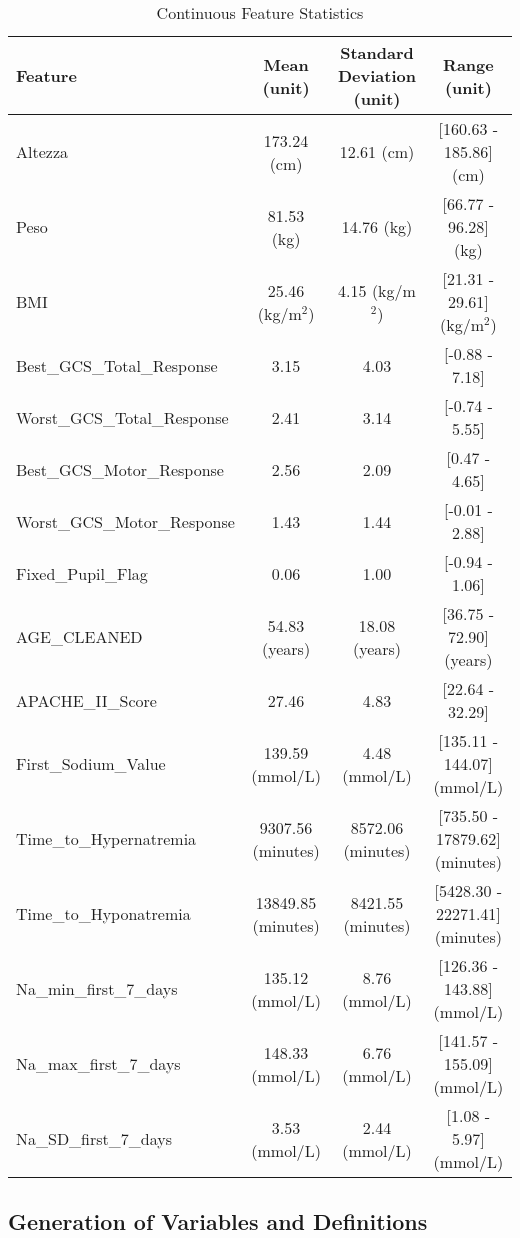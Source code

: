 \begin{table}[h!]
	\centering
	\tiny %
	\begin{tabular}{lccc}
		\hline
		\textbf{Feature} & \textbf{Mean (unit)} & \textbf{Standard Deviation (unit)} & \textbf{Range (unit)} \\ \hline
		Altezza & 173.24 (cm) & 12.61 (cm) & [160.63 - 185.86] (cm) \\
		Peso & 81.53 (kg) & 14.76 (kg) & [66.77 - 96.28] (kg) \\
		BMI & 25.46 (kg/m$^2$) & 4.15 (kg/m$^2$) & [21.31 - 29.61] (kg/m$^2$) \\
		Best\_GCS\_Total\_Response & 3.15 & 4.03 & [-0.88 - 7.18] \\
		Worst\_GCS\_Total\_Response & 2.41 & 3.14 & [-0.74 - 5.55] \\
		Best\_GCS\_Motor\_Response & 2.56 & 2.09 & [0.47 - 4.65] \\
		Worst\_GCS\_Motor\_Response & 1.43 & 1.44 & [-0.01 - 2.88] \\
		Fixed\_Pupil\_Flag & 0.06 & 1.00 & [-0.94 - 1.06] \\
		AGE\_CLEANED & 54.83 (years) & 18.08 (years) & [36.75 - 72.90] (years) \\
		APACHE\_II\_Score & 27.46 & 4.83 & [22.64 - 32.29] \\
		First\_Sodium\_Value & 139.59 (mmol/L) & 4.48 (mmol/L) & [135.11 - 144.07] (mmol/L) \\
		Time\_to\_Hypernatremia & 9307.56 (minutes) & 8572.06 (minutes) & [735.50 - 17879.62] (minutes) \\
		Time\_to\_Hyponatremia & 13849.85 (minutes) & 8421.55 (minutes) & [5428.30 - 22271.41] (minutes) \\
		Na\_min\_first\_7\_days & 135.12 (mmol/L) & 8.76 (mmol/L) & [126.36 - 143.88] (mmol/L) \\
		Na\_max\_first\_7\_days & 148.33 (mmol/L) & 6.76 (mmol/L) & [141.57 - 155.09] (mmol/L) \\
		Na\_SD\_first\_7\_days & 3.53 (mmol/L) & 2.44 (mmol/L) & [1.08 - 5.97] (mmol/L) \\
		\hline
	\end{tabular}
	\caption{Continuous Feature Statistics}
	\label{tab:continuous_features}
\end{table}



\subsection{Generation of Variables and Definitions}

